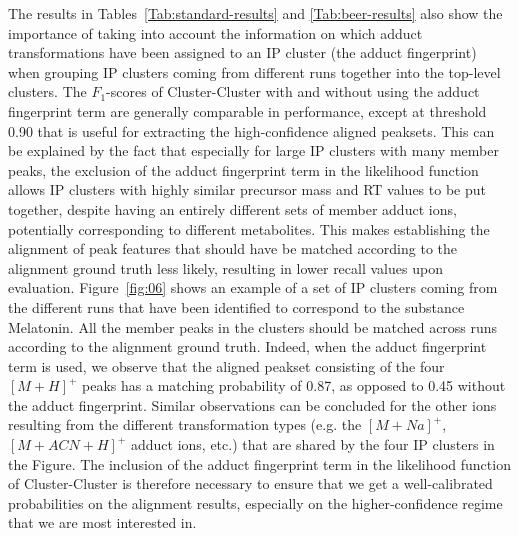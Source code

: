 The results in Tables~\ref{Tab:standard-results} and \ref{Tab:beer-results} also show the importance of taking into account the information on which adduct transformations have been assigned to an IP cluster (the adduct fingerprint) when grouping IP clusters coming from different runs together into the top-level clusters. The $F_1$-scores of Cluster-Cluster with and without using the adduct fingerprint term are generally comparable in performance, except at threshold 0.90 that is useful for extracting the high-confidence aligned peaksets. This can be explained by the fact that especially for large IP clusters with many member peaks, the exclusion of the adduct fingerprint term in the likelihood function allows IP clusters with highly similar precursor mass and RT values to be put together, despite having an entirely different sets of member adduct ions, potentially corresponding to different metabolites. This makes establishing the alignment of peak features that should have be matched according to the alignment ground truth less likely, resulting in lower recall values upon evaluation. Figure~\ref{fig:06} shows an example of a set of IP clusters coming from the different runs that have been identified to correspond to the substance Melatonin. All the member peaks in the clusters should be matched across runs according to the alignment ground truth. Indeed, when the adduct fingerprint term is used, we observe that the aligned peakset consisting of the four $[M+H]^+$ peaks has a matching probability of 0.87, as opposed to 0.45 without the adduct fingerprint. Similar observations can be concluded for the other ions resulting from the different transformation types (e.g. the $[M+Na]^+$, $[M+ACN+H]^+$ adduct ions, etc.) that are shared by the four IP clusters in the Figure. The inclusion of the adduct fingerprint term in the likelihood function of Cluster-Cluster is therefore necessary to ensure that we get a well-calibrated probabilities on the alignment results, especially on the higher-confidence regime that we are most interested in. 

